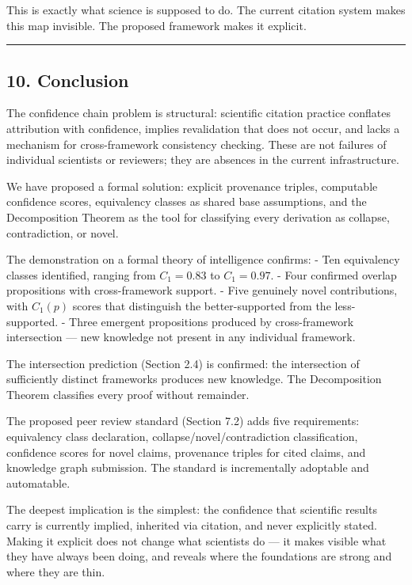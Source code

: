 \documentclass[
]{article}
\begin{document}
This is exactly what science is supposed to do. The current citation
system makes this map invisible. The proposed framework makes it
explicit.

\begin{center}\rule{0.5\linewidth}{0.5pt}\end{center}

\subsection{10. Conclusion}\label{conclusion}

The confidence chain problem is structural: scientific citation practice
conflates attribution with confidence, implies revalidation that does
not occur, and lacks a mechanism for cross-framework consistency
checking. These are not failures of individual scientists or reviewers;
they are absences in the current infrastructure.

We have proposed a formal solution: explicit provenance triples,
computable confidence scores, equivalency classes as shared base
assumptions, and the Decomposition Theorem as the tool for classifying
every derivation as collapse, contradiction, or novel.

The demonstration on a formal theory of intelligence confirms: - Ten
equivalency classes identified, ranging from \(C_1 = 0.83\) to
\(C_1 = 0.97\). - Four confirmed overlap propositions with
cross-framework support. - Five genuinely novel contributions, with
\(C_1(p)\) scores that distinguish the better-supported from the
less-supported. - Three emergent propositions produced by
cross-framework intersection --- new knowledge not present in any
individual framework.

The intersection prediction (Section 2.4) is confirmed: the intersection
of sufficiently distinct frameworks produces new knowledge. The
Decomposition Theorem classifies every proof without remainder.

The proposed peer review standard (Section 7.2) adds five requirements:
equivalency class declaration, collapse/novel/contradiction
classification, confidence scores for novel claims, provenance triples
for cited claims, and knowledge graph submission. The standard is
incrementally adoptable and automatable.

The deepest implication is the simplest: the confidence that scientific
results carry is currently implied, inherited via citation, and never
explicitly stated. Making it explicit does not change what scientists do
--- it makes visible what they have always been doing, and reveals where
the foundations are strong and where they are thin.
\end{document}
